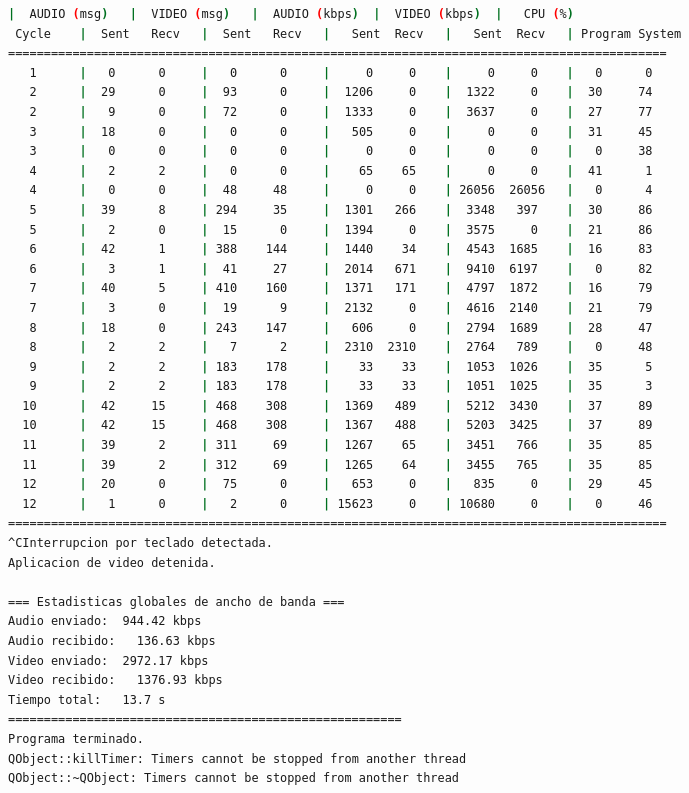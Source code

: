 \begin{adjustbox}{max width=\textwidth}
\begin{lstlisting}[language=bash,basicstyle=\ttfamily\scriptsize]
          |  AUDIO (msg)   |  VIDEO (msg)   |  AUDIO (kbps)  |  VIDEO (kbps)  |   CPU (%)
 Cycle    |  Sent   Recv   |  Sent   Recv   |   Sent  Recv   |   Sent  Recv   | Program System
============================================================================================
   1      |   0      0     |   0      0     |     0     0    |     0     0    |   0      0
   2      |  29      0     |  93      0     |  1206     0    |  1322     0    |  30     74
   2      |   9      0     |  72      0     |  1333     0    |  3637     0    |  27     77
   3      |  18      0     |   0      0     |   505     0    |     0     0    |  31     45
   3      |   0      0     |   0      0     |     0     0    |     0     0    |   0     38
   4      |   2      2     |   0      0     |    65    65    |     0     0    |  41      1
   4      |   0      0     |  48     48     |     0     0    | 26056  26056   |   0      4
   5      |  39      8     | 294     35     |  1301   266    |  3348   397    |  30     86
   5      |   2      0     |  15      0     |  1394     0    |  3575     0    |  21     86
   6      |  42      1     | 388    144     |  1440    34    |  4543  1685    |  16     83
   6      |   3      1     |  41     27     |  2014   671    |  9410  6197    |   0     82
   7      |  40      5     | 410    160     |  1371   171    |  4797  1872    |  16     79
   7      |   3      0     |  19      9     |  2132     0    |  4616  2140    |  21     79
   8      |  18      0     | 243    147     |   606     0    |  2794  1689    |  28     47
   8      |   2      2     |   7      2     |  2310  2310    |  2764   789    |   0     48
   9      |   2      2     | 183    178     |    33    33    |  1053  1026    |  35      5
   9      |   2      2     | 183    178     |    33    33    |  1051  1025    |  35      3
  10      |  42     15     | 468    308     |  1369   489    |  5212  3430    |  37     89
  10      |  42     15     | 468    308     |  1367   488    |  5203  3425    |  37     89
  11      |  39      2     | 311     69     |  1267    65    |  3451   766    |  35     85
  11      |  39      2     | 312     69     |  1265    64    |  3455   765    |  35     85
  12      |  20      0     |  75      0     |   653     0    |   835     0    |  29     45
  12      |   1      0     |   2      0     | 15623     0    | 10680     0    |   0     46
============================================================================================
^CInterrupcion por teclado detectada.
Aplicacion de video detenida.

=== Estadisticas globales de ancho de banda ===
Audio enviado:	944.42 kbps
Audio recibido:   136.63 kbps
Video enviado:	2972.17 kbps
Video recibido:   1376.93 kbps
Tiempo total: 	13.7 s
=======================================================
Programa terminado.
QObject::killTimer: Timers cannot be stopped from another thread
QObject::~QObject: Timers cannot be stopped from another thread
\end{lstlisting}
\end{adjustbox}
\vspace{\baselineskip}

